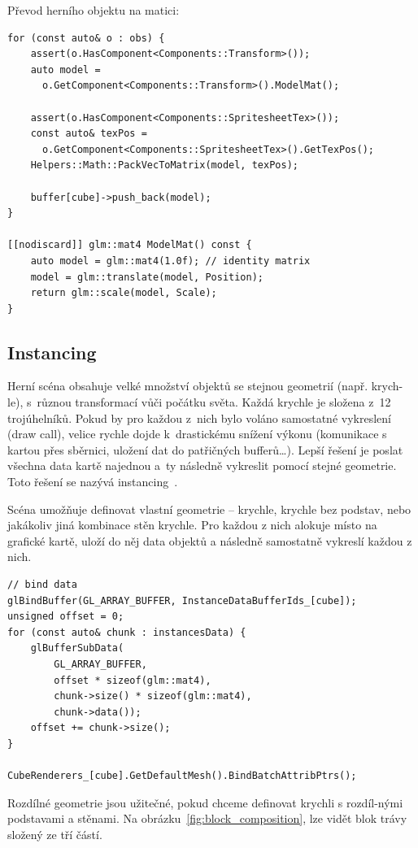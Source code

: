 \documentclass[thesis=M,czech]{FITthesis}[2019/12/23]
\begin{document}
Převod herního objektu na matici:

\begin{verbatim}
for (const auto& o : obs) {
    assert(o.HasComponent<Components::Transform>());
    auto model =
      o.GetComponent<Components::Transform>().ModelMat();

    assert(o.HasComponent<Components::SpritesheetTex>());
    const auto& texPos = 
      o.GetComponent<Components::SpritesheetTex>().GetTexPos();
    Helpers::Math::PackVecToMatrix(model, texPos);

    buffer[cube]->push_back(model);
}

[[nodiscard]] glm::mat4 ModelMat() const {
    auto model = glm::mat4(1.0f); // identity matrix
    model = glm::translate(model, Position);
    return glm::scale(model, Scale);
}
\end{verbatim}

\subsection{Instancing}

Herní scéna obsahuje velké množství objektů se stejnou geometrií (např. krych-le), s~různou transformací vůči počátku světa. Každá krychle je složena z~12 trojúhelníků. Pokud by pro každou z~nich bylo voláno samostatné vykreslení (draw call), velice rychle dojde k~drastickému snížení výkonu (komunikace s kartou přes sběrnici, uložení dat do patřičných bufferů\dots). Lepší řešení je poslat všechna data kartě najednou a~ty následně vykreslit pomocí stejné geometrie. Toto řešení se nazývá instancing~\cite{lopgl_instancing}.

Scéna umožňuje definovat vlastní geometrie -- krychle, krychle bez podstav, nebo jakákoliv jiná kombinace stěn krychle. Pro každou z nich alokuje místo na grafické kartě, uloží do něj data objektů a následně samostatně vykreslí každou z nich.

\begin{verbatim}
// bind data
glBindBuffer(GL_ARRAY_BUFFER, InstanceDataBufferIds_[cube]);
unsigned offset = 0;
for (const auto& chunk : instancesData) {
    glBufferSubData(
        GL_ARRAY_BUFFER,
        offset * sizeof(glm::mat4), 
        chunk->size() * sizeof(glm::mat4), 
        chunk->data());
    offset += chunk->size();
}

CubeRenderers_[cube].GetDefaultMesh().BindBatchAttribPtrs();
\end{verbatim}

Rozdílné geometrie jsou užitečné, pokud chceme definovat krychli s rozdíl-nými podstavami a stěnami. Na obrázku~\ref{fig:block_composition}, lze vidět blok trávy složený ze tří částí.
\end{document}
